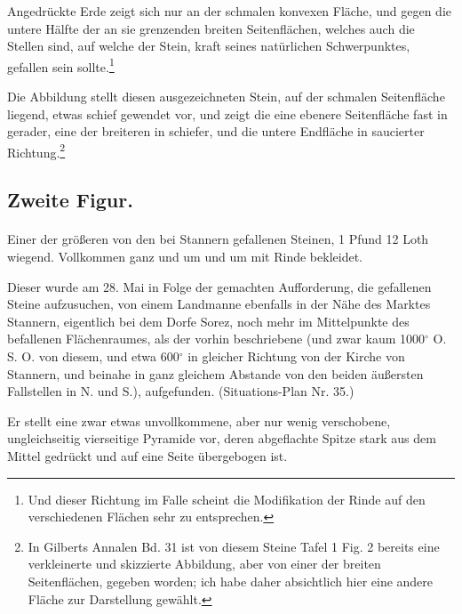 \documentclass[a4paper, 11pt, oneside, german]{article}
\begin{document}
Angedrückte Erde zeigt sich nur an der schmalen konvexen Fläche, und gegen die untere Hälfte der an sie grenzenden breiten Seitenflächen, welches auch die Stellen sind, auf welche der Stein, kraft seines natürlichen Schwerpunktes, gefallen sein sollte.\footnote{Und dieser Richtung im Falle scheint die Modifikation der Rinde auf den verschiedenen Flächen sehr zu entsprechen.}

Die Abbildung stellt diesen ausgezeichneten Stein, auf der schmalen Seitenfläche liegend, etwas schief gewendet vor, und zeigt die eine ebenere Seitenfläche fast in gerader, eine der breiteren in schiefer, und die untere Endfläche in saucierter Richtung.\footnote{In Gilberts Annalen Bd. 31 ist von diesem Steine Tafel 1 Fig. 2 bereits eine verkleinerte und skizzierte Abbildung, aber von einer der breiten Seitenflächen, gegeben worden; ich habe daher absichtlich hier eine andere Fläche zur Darstellung gewählt.}

\subsection{Zweite Figur.}
\paragraph{}
Einer der größeren von den bei Stannern gefallenen Steinen, 1 Pfund 12 Loth wiegend. Vollkommen ganz und um und um mit Rinde bekleidet.

Dieser wurde am 28. Mai in Folge der gemachten Aufforderung, die gefallenen Steine aufzusuchen, von einem Landmanne ebenfalls in der Nähe des Marktes Stannern, eigentlich bei dem Dorfe Sorez, noch mehr im Mittelpunkte des befallenen Flächenraumes, als der vorhin beschriebene (und zwar kaum 1000$^{\circ}$ O. S. O. von diesem, und etwa 600$^{\circ}$ in gleicher Richtung von der Kirche von Stannern, und beinahe in ganz gleichem Abstande von den beiden äußersten Fallstellen in N. und S.), aufgefunden. (Situations-Plan Nr. 35.)

Er stellt eine zwar etwas unvollkommene, aber nur wenig verschobene, ungleichseitig vierseitige Pyramide vor, deren abgeflachte Spitze stark aus dem Mittel gedrückt und auf eine Seite übergebogen ist.
\end{document}
